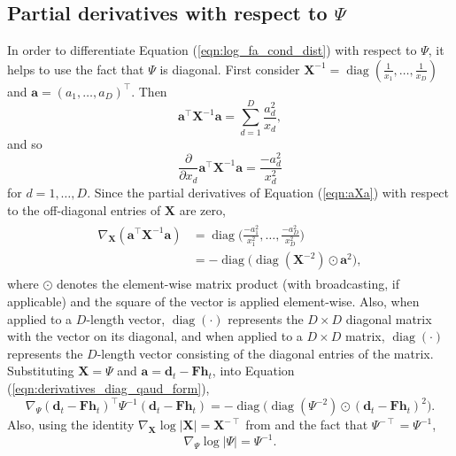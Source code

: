 \documentclass[msc,deptreport.inf]{infthesis} %
\newcommand{\matr}[1]{\mathbf{#1}}
\newcommand{\diag}{\mathop{\mathrm{diag}}}
\begin{document}
\subsection{Partial derivatives with respect to $\Psi$}

In order to differentiate Equation (\ref{eqn:log_fa_cond_dist}) with respect to $\Psi$, it helps to use the fact that $\Psi$ is diagonal. First consider $\matr{X}^{-1} = \diag(\frac{1}{x_1}, \dots, \frac{1}{x_D})$ and $\matr{a} = (a_1, \dots, a_D)^\intercal$. Then 
\begin{equation}\label{eqn:aXa}
	\matr{a}^\intercal \matr{X}^{-1} \matr{a} = \sum_{d=1}^D \frac{a_d^2}{x_d},
\end{equation}
and so
\begin{equation}
	\frac{\partial}{\partial x_d} \matr{a}^\intercal \matr{X}^{-1} \matr{a} = \frac{-a_d^2}{x_d^2}
\end{equation}
for $d=1, \dots, D$. Since the partial derivatives of Equation (\ref{eqn:aXa}) with respect to the off-diagonal entries of $\matr{X}$ are zero, 
\begin{align}\label{eqn:derivatives_diag_qaud_form}
\begin{split}
	\nabla_\matr{X} (\matr{a}^\intercal \matr{X}^{-1} \matr{a}) 
	& = \diag\Big({\frac{-a_1^2}{x_1^2}, \dots, \frac{-a_D^2}{x_D^2}}\Big) \\
	& = -\diag\big(\diag(\matr{X}^{-2}) \odot \matr{a}^2\big),
\end{split}
\end{align}  
where $\odot$ denotes the element-wise matrix product (with broadcasting, if applicable) and the square of the vector is applied element-wise. Also, when applied to a $D$-length vector, $\diag(\cdot)$ represents the $D \times D$ diagonal matrix with the vector on its diagonal, and when applied to a $D \times D$ matrix, $\diag(\cdot)$ represents the $D$-length vector consisting of the diagonal entries of the matrix. Substituting $\matr{X} = \Psi$ and $\matr{a} = \matr{d}_t - \matr{Fh}_t$, into Equation (\ref{eqn:derivatives_diag_qaud_form}),
\begin{equation}\label{eqn:derivatives_wrt_Psi_1}
	\nabla_\Psi (\matr{d}_t - \matr{Fh}_t)^\intercal \Psi^{-1} (\matr{d}_t - \matr{Fh}_t) 
	= -\diag\big(\diag(\Psi^{-2}) \odot (\matr{d}_t - \matr{Fh}_t)^2\big).
\end{equation}
Also, using the identity $\nabla_\matr{X} \log |\matr{X}| = \matr{X}^{-\intercal}$ from \cite{petersen2012} and the fact that $\Psi^{-\intercal} = \Psi^{-1}$, 
\begin{equation}\label{eqn:derivatives_wrt_Psi_2}
	\nabla_\Psi \log |\Psi|
	= \Psi^{-1}.
\end{equation}
\end{document}
